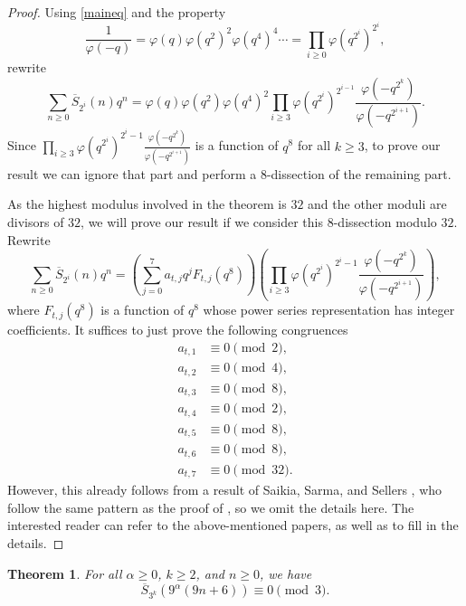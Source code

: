 \documentclass[12pt]{amsart}
\newcommand{\sst}{\overline{S}}
\theoremstyle{plain}
\newtheorem{theorem}{Theorem}[section]
\theoremstyle{definition}
\begin{document}
\begin{proof}
Using \eqref{maineq} and the property
\begin{equation*}
    \frac{1}{\varphi(-q)}=\varphi(q)\varphi(q^2)^2\varphi(q^4)^4\cdots =\prod_{i\geq 0}\varphi(q^{2^i})^{2^i},
\end{equation*}
rewrite
\[
\sum_{n\geq 0}\sst_{2^i}(n)q^n=\varphi(q)\varphi(q^2)\varphi(q^4)^2\prod_{i\geq 3}\varphi(q^{2^i})^{2^{i-1}}\frac{\varphi(-q^{2^k})}{\varphi(-q^{2^{i+1}})}.
\]
Since $\prod_{i\geq 3}\varphi(q^{2^i})^{2^i-1}\frac{\varphi(-q^{2^k})}{\varphi(-q^{2^{i+1}})}$ is a function of $q^8$ for all $k\geq 3$, to prove our result we can ignore that part and perform a $8$-dissection of the remaining part.

As the highest modulus involved in the theorem is $32$ and the other moduli are divisors of $32$, we will prove our result if we consider this $8$-dissection modulo $32$. Rewrite
\[
\sum_{n\geq 0}\sst_{2^i}(n)q^n=\left(\sum_{j=0}^{7}a_{t,j}q^{j}F_{t,j}(q^8)\right) \left(\prod_{i\geq 3}\varphi(q^{2^i})^{2^i-1}\frac{\varphi(-q^{2^k})}{\varphi(-q^{2^{i+1}})}\right),
\]
where $F_{t,j}(q^8)$ is a function of $q^8$ whose power series representation has integer coefficients. It suffices to just prove the following congruences
\begin{align*}
    a_{t,1} &\equiv 0 \pmod{2},\\
    a_{t,2} &\equiv 0 \pmod{4},\\
    a_{t,3} &\equiv 0 \pmod{8},\\
    a_{t,4} &\equiv 0 \pmod{2},\\
    a_{t,5} &\equiv 0 \pmod{8},\\
    a_{t,6} &\equiv 0 \pmod{8},\\
    a_{t,7} &\equiv 0 \pmod{32}.
\end{align*}
However, this already follows from a result of Saikia,  Sarma, and Sellers \cite[Lemma 6.1]{SSS25}, who follow the same pattern as the proof of \cite[Theorem 2.2]{Sel24}, so we omit the details here. The interested reader can refer to the above-mentioned papers, as well as \cite[Theorem 1.9]{SS25} to fill in the details.
\end{proof}


\begin{theorem}\label{thmhs}
For all $\alpha\geq 0$, $k\geq 2$, and $n\geq 0$, we have
\begin{equation}\label{eq3j}
\sst_{3^k}(9^\alpha(9n+6))\equiv 0 \pmod 3.
\end{equation}
\end{theorem}
\end{document}
